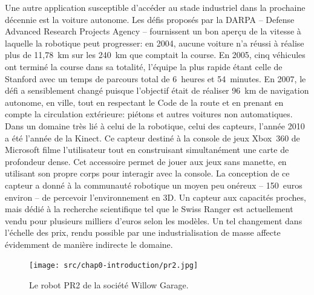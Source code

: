 Une autre application susceptible d'accéder au stade industriel dans
la prochaine décennie est la voiture autonome. Les défis proposés par
la DARPA -- Defense Advanced Research Projects Agency -- fournissent
un bon aperçu de la vitesse à laquelle la robotique peut progresser:
en 2004, aucune voiture n'a réussi à réalise plus de 11,78 km sur les
240 km que comptait la course. En 2005, cinq véhicules ont terminé la
course dans sa totalité, l'équipe la plus rapide étant celle de
Stanford avec un temps de parcours total de 6 heures et 54 minutes. En
2007, le défi a sensiblement changé puisque l'objectif était de
réaliser 96 km de navigation autonome, en ville, tout en respectant le
Code de la route et en prenant en compte la circulation extérieure:
piétons et autres voitures non automatiques. Dans un domaine très lié
à celui de la robotique, celui des capteurs, l'année 2010 a été
l'année de la Kinect. Ce capteur destiné à
la console de jeux Xbox 360 de Microsoft filme l'utilisateur tout en
construisant simultanément une carte de profondeur dense. Cet
accessoire permet de jouer aux jeux sans manette, en utilisant son
propre corps pour interagir avec la console. La conception de ce
capteur a donné à la communauté robotique un moyen peu onéreux --
150 euros environ -- de percevoir l'environnement en 3D. Un capteur
aux capacités proches, mais dédié à la recherche scientifique tel que
le Swiss Ranger est actuellement vendu pour
plusieurs milliers d'euros selon les modèles. Un tel changement dans
l'échelle des prix, rendu possible par une industrialisation de masse
affecte évidemment de manière indirecte le domaine.


\begin{figure}
  \begin{center}
    \texttt{[image: src/chap0-introduction/pr2.jpg]}
  \end{center}
  \caption{Le robot PR2 de la société Willow Garage. \label{fig:pr2}}
\end{figure}


